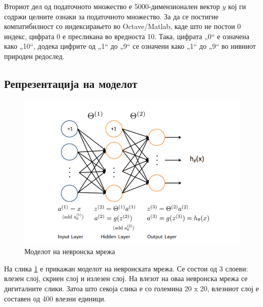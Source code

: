 Вториот дел од податочното множество е 5000-димензионален вектор $y$ кој 
ги содржи целните ознаки за податочното множество. За да се постигне
компатибилност со индексирањето во Octave/Matlab, каде што не постои 0 индекс,
цифрата 0 е пресликана во вредноста 10. Така, цифрата „0“ е означена како „10“,
додека цифрите од „1“ до „9“ се означени како „1“ до „9“ во нивниот природен
редослед.

\subsection{Репрезентација на моделот}

\begin{figure}[htb]
\centering
\includegraphics[width=.9\textwidth]{src/neuralNetwork2/neuralNetwork}
\caption{Моделот на невронска мрежа}
\label{fig:neuralNetwork}
\end{figure}

На слика \ref{fig:neuralNetwork} е прикажан моделот на невронската мрежа. Се
состои од 3 слоеви: влезен слој, скриен слој и излезен слој. На влезот на оваа
невронска мрежа се дигиталните слики. Затоа што секоја слика е со големина 20 x
20, влезниот слој е составен од 400 влезни единици.
